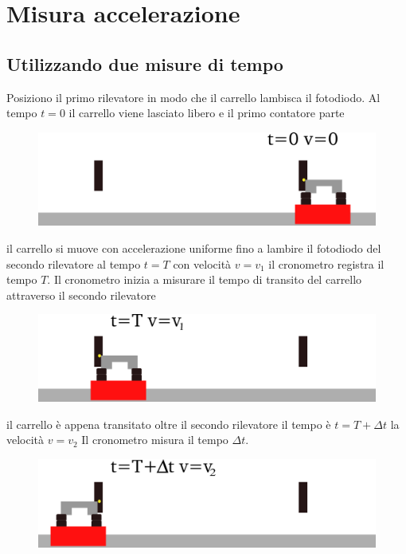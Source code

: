 \documentclass[a4paper,10pt,oneside]{article}
\begin{document}
\section*{Misura accelerazione}

\subsection*{Utilizzando due misure di tempo}

Posiziono il primo rilevatore in modo che il carrello lambisca il fotodiodo. Al tempo $t=0$ il carrello viene lasciato libero e il primo contatore parte 

\begin{figure}[H]
 \centering
 \includegraphics[width=\textwidth]{./immagini/misura_accelerazione1.png}
 \label{fig:accelerazione1}
\end{figure}

il carrello si muove con accelerazione uniforme fino a lambire il fotodiodo del secondo rilevatore al tempo $t=T$ con velocità $v=v_1$ il cronometro registra il tempo $T$. Il cronometro inizia a misurare il tempo di transito del carrello attraverso il secondo rilevatore

\begin{figure}[H]
 \centering
 \includegraphics[width=\textwidth]{./immagini/misura_accelerazione2.png}
 \label{fig:accelerazione2}
\end{figure}

il carrello è appena transitato oltre il secondo rilevatore il tempo è  $t=T+\Delta t$ la velocità $v=v_2$ Il cronometro misura il tempo $\Delta t$.
\begin{figure}[H]
 \centering
 \includegraphics[width=\textwidth]{./immagini/misura_accelerazione3.png}
 \label{fig:accelerazione3}
\end{figure}
\end{document}
